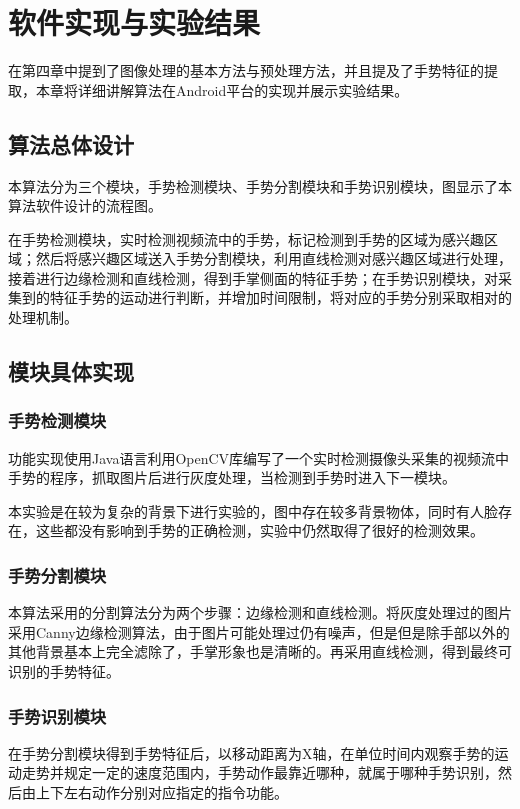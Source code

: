 \documentclass{XDBAthesis}
\begin{document}
\else
\fi
\chapter{软件实现与实验结果}
在第四章中提到了图像处理的基本方法与预处理方法，并且提及了手势特征的提取，本章将详细讲解算法在Android平台的实现并展示实验结果。

\section{算法总体设计}

本算法分为三个模块，手势检测模块、手势分割模块和手势识别模块，图显示了本算法软件设计的流程图。

在手势检测模块，实时检测视频流中的手势，标记检测到手势的区域为感兴趣区域；然后将感兴趣区域送入手势分割模块，利用直线检测对感兴趣区域进行处理，接着进行边缘检测和直线检测，得到手掌侧面的特征手势；在手势识别模块，对采集到的特征手势的运动进行判断，并增加时间限制，将对应的手势分别采取相对的处理机制。

\section{模块具体实现}

\subsection{手势检测模块}

功能实现使用Java语言利用OpenCV库编写了一个实时检测摄像头采集的视频流中手势的程序，抓取图片后进行灰度处理，当检测到手势时进入下一模块。

本实验是在较为复杂的背景下进行实验的，图中存在较多背景物体，同时有人脸存在，这些都没有影响到手势的正确检测，实验中仍然取得了很好的检测效果。

\subsection{手势分割模块}

    本算法采用的分割算法分为两个步骤：边缘检测和直线检测。将灰度处理过的图片采用Canny边缘检测算法，由于图片可能处理过仍有噪声，但是但是除手部以外的其他背景基本上完全滤除了，手掌形象也是清晰的。再采用直线检测，得到最终可识别的手势特征。

\subsection{手势识别模块}

在手势分割模块得到手势特征后，以移动距离为X轴，在单位时间内观察手势的运动走势并规定一定的速度范围内，手势动作最靠近哪种，就属于哪种手势识别，然后由上下左右动作分别对应指定的指令功能。



\ifx\allfiles\undefined
%

\end{document}
